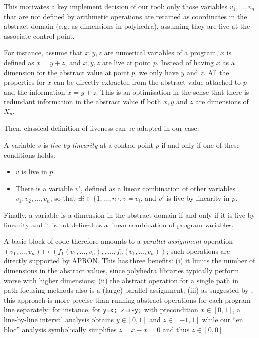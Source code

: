 \documentclass{entcs}
\begin{document}
This motivates a key implement decision of our tool: only those variables
$v_1,\dots,v_n$ that are not defined by arithmetic operations are retained as
coordinates in the abstract domain (e.g. as dimensions in polyhedra), assuming
they are live at the associate control point. 

	For instance, assume that $x,y,z$ are numerical variables of a program,
	$x$ is defined as $x = y+z$, and $x,y,z$ are live at point $p$. Instead of having
	$x$ as a dimension for the abstract value at point $p$, we only have $y$ and $z$. All the properties
	for $x$ can be directly extracted from the abstract value attached to $p$ and the information $x=y+z$.
	This is an optimisation in the sense that there is redundant information in
	the abstract value if both $x,y$ and $z$ are dimensions of $X_p$.

	Then, classical definition of liveness can be adapted in our case:

	\begin{definition}
	A variable $v$ is \emph{live by linearity} at a control point $p$ if and
	only if one of these conditions holds:
		\begin{itemize}
		\item $v$ is live in $p$.
		\item There is a variable $v'$, defined as a linear combination of other
		variables $v_1, v_2, \dots, v_n$, so that $\exists i \in \{1,\dots,n\}, v = v_i$,
		and $v'$ is live by linearity in $p$.
		\end{itemize}
	\end{definition}

	Finally, a variable is a dimension in the abstract domain if and only if it
	is live by linearity and it is not defined as a linear combination of
	program variables.

A basic block of code therefore amounts to a \emph{parallel assignment} operation
$(v_1,\dots,v_n) \allowbreak\mapsto\allowbreak
(f_1(v_1,\dots,v_n), \allowbreak, \dots, \allowbreak
 f_n(v_1,\dots,v_n))$;
such operations are directly supported by APRON. This has three benefits:
(i) it limits the number of dimensions in the abstract values, since polyhedra libraries typically perform worse with higher dimensions;
(ii) the abstract operation for a single path in path-focusing methods also is a (large) parallel assignment;
(iii) as suggested by \citet{DBLP:conf/vmcai/Mine06}, this approach is more precise than running abstract operations for each program line separately:
for instance, for \lstinline|y=x; z=x-y;| with precondition $x \in [0,1]$, a line-by-line interval analysis obtains $y \in [0,1]$ and $z \in [-1,1]$ while our ``en bloc'' analysis symbolically simplifies $z = x - x = 0$ and thus $z \in [0,0]$.
\end{document}
